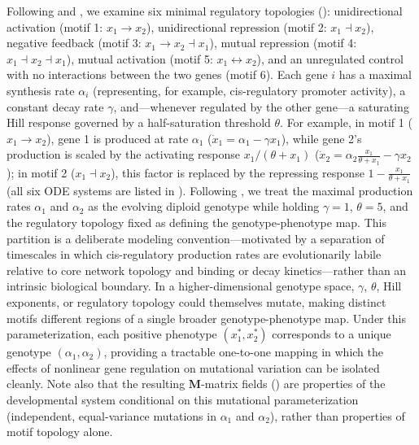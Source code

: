 Following \cite{hether2014genetic} and \cite{gjuvsland2007statistical}, we examine six minimal regulatory topologies (): unidirectional activation (motif 1: $x_1 \to x_2$), unidirectional repression (motif 2: $x_1 \dashv x_2$), negative feedback (motif 3: $x_1 \to x_2 \dashv x_1$), mutual repression (motif 4: $x_1 \dashv x_2 \dashv x_1$), mutual activation (motif 5: $x_1 \leftrightarrow x_2$), and an unregulated control with no interactions between the two genes (motif 6).
Each gene $i$ has a maximal synthesis rate $\alpha_i$ (representing, for example, cis-regulatory promoter activity), a constant decay rate $\gamma$, and—whenever regulated by the other gene—a saturating Hill response governed by a half-saturation threshold $\theta$.
For example, in motif 1 ($x_1 \to x_2$), gene 1 is produced at rate $\alpha_1$ ($\dot{x}_1 = \alpha_1 - \gamma x_1$), while gene 2's production is scaled by the activating response $x_1 / (\theta + x_1)$ ($\dot{x}_2 = \alpha_2 \frac{x_1}{\theta + x_1} - \gamma x_2$); in motif 2 ($x_1 \dashv x_2$), this factor is replaced by the repressing response $1 - \frac{x_1}{\theta + x_1}$ (all six ODE systems are listed in ).
Following \cite{hether2014genetic}, we treat the maximal production rates $\alpha_1$ and $\alpha_2$ as the evolving diploid genotype while holding $\gamma = 1$, $\theta = 5$, and the regulatory topology fixed as defining the genotype-phenotype map.
This partition is a deliberate modeling convention---motivated by a separation of timescales in which cis-regulatory production rates are evolutionarily labile relative to core network topology and binding or decay kinetics---rather than an intrinsic biological boundary.
In a higher-dimensional genotype space, $\gamma$, $\theta$, Hill exponents, or regulatory topology could themselves mutate, making distinct motifs different regions of a single broader genotype-phenotype map.
Under this parameterization, each positive phenotype $(x_1^*, x_2^*)$ corresponds to a unique genotype $(\alpha_1, \alpha_2)$, providing a tractable one-to-one mapping in which the effects of nonlinear gene regulation on mutational variation can be isolated cleanly.
Note also that the resulting $\mathbf{M}$-matrix fields () are properties of the developmental system conditional on this mutational parameterization (independent, equal-variance mutations in $\alpha_1$ and $\alpha_2$), rather than properties of motif topology alone.

